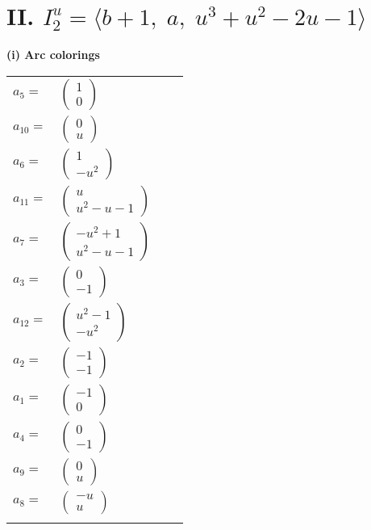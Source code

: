 \documentclass[1p]{elsarticle_modified}
\theoremstyle{definition}
\begin{document}
\centering \section*{II. $I^u_{2}= \langle b+1,\;a,\;u^3+u^2-2 u-1 \rangle$}
\flushleft \textbf{(i) Arc colorings}\\
\begin{tabular}{m{7pt} m{180pt} m{7pt} m{180pt} }
\flushright $a_{5}=$&$\begin{pmatrix}1\\0\end{pmatrix}$ \\
\flushright $a_{10}=$&$\begin{pmatrix}0\\u\end{pmatrix}$ \\
\flushright $a_{6}=$&$\begin{pmatrix}1\\- u^2\end{pmatrix}$ \\
\flushright $a_{11}=$&$\begin{pmatrix}u\\u^2- u-1\end{pmatrix}$ \\
\flushright $a_{7}=$&$\begin{pmatrix}- u^2+1\\u^2- u-1\end{pmatrix}$ \\
\flushright $a_{3}=$&$\begin{pmatrix}0\\-1\end{pmatrix}$ \\
\flushright $a_{12}=$&$\begin{pmatrix}u^2-1\\- u^2\end{pmatrix}$ \\
\flushright $a_{2}=$&$\begin{pmatrix}-1\\-1\end{pmatrix}$ \\
\flushright $a_{1}=$&$\begin{pmatrix}-1\\0\end{pmatrix}$ \\
\flushright $a_{4}=$&$\begin{pmatrix}0\\-1\end{pmatrix}$ \\
\flushright $a_{9}=$&$\begin{pmatrix}0\\u\end{pmatrix}$ \\
\flushright $a_{8}=$&$\begin{pmatrix}- u\\u\end{pmatrix}$\\&\end{tabular}
\end{document}
